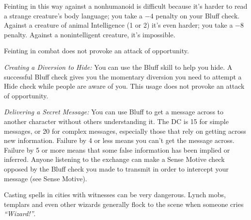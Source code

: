 Feinting in this way against a nonhumanoid is difficult because it's harder to read a strange creature's body language; you take a $-4$ penalty on your Bluff check. Against a creature of animal Intelligence (1 or 2) it's even harder; you take a $-8$ penalty. Against a nonintelligent creature, it's impossible.

Feinting in combat does not provoke an attack of opportunity.

\textit{Creating a Diversion to Hide:} You can use the Bluff skill to help you hide. A successful Bluff check gives you the momentary diversion you need to attempt a Hide check while people are aware of you. This usage does not provoke an attack of opportunity.

\textit{Delivering a Secret Message:} You can use Bluff to get a message across to another character without others understanding it. The DC is 15 for simple messages, or 20 for complex messages, especially those that rely on getting across new information. Failure by 4 or less means you can't get the message across. Failure by 5 or more means that some false information has been implied or inferred. Anyone listening to the exchange can make a Sense Motive check opposed by the Bluff check you made to transmit in order to intercept your message (see Sense Motive).




Casting spells in cities with witnesses can be very dangerous. Lynch mobs, templars and even other wizards generally flock to the scene when someone cries \textit{``Wizard!''}.

